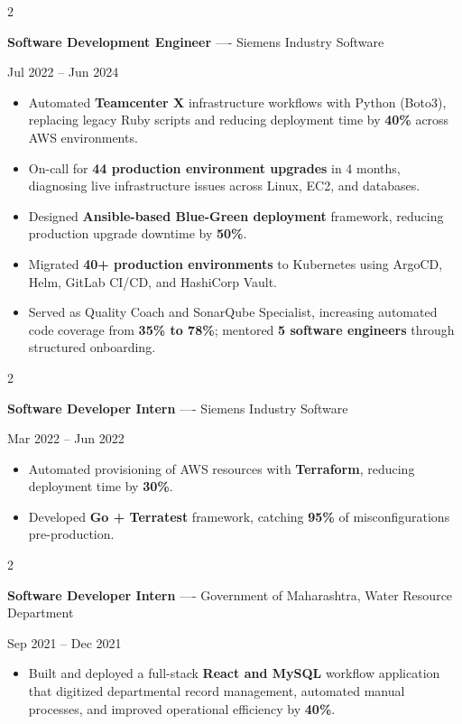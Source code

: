 \documentclass[10pt, letterpaper]{article}
\newenvironment{highlights}{
    \begin{itemize}[
        topsep=0.10 cm,
        parsep=0.06 cm,
        partopsep=0pt,
        itemsep=0.06 cm,
        leftmargin=12pt
    ]
}{
    \end{itemize}
}
\newenvironment{twocolentry}[2][]{
    \onecolentry
    \def\secondColumn{#2}
    \setcolumnwidth{\fill, 4.5 cm}
    \begin{paracol}{2}
}{
    \switchcolumn \raggedleft \secondColumn
    \end{paracol}
    \endonecolentry
}
\begin{document}
\vspace{0.15 cm}

\begin{twocolentry}{Jul 2022 -- Jun 2024}
\textbf{Software Development Engineer} ---- Siemens Industry Software
\end{twocolentry}
\begin{highlights}
  \item Automated \textbf{Teamcenter X} infrastructure workflows with Python (Boto3), replacing legacy Ruby scripts and reducing deployment time by \textbf{40\%} across AWS environments.
  \item On-call for \textbf{44 production environment upgrades} in 4 months, diagnosing live infrastructure issues across Linux, EC2, and databases.
  \item Designed \textbf{Ansible-based Blue-Green deployment} framework, reducing production upgrade downtime by \textbf{50\%}.
  \item Migrated \textbf{40+ production environments} to Kubernetes using ArgoCD, Helm, GitLab CI/CD, and HashiCorp Vault.
  \item Served as Quality Coach and SonarQube Specialist, increasing automated code coverage from \textbf{35\% to 78\%}; mentored \textbf{5 software engineers} through structured onboarding.
\end{highlights}

\vspace{0.15 cm}

\begin{twocolentry}{Mar 2022 -- Jun 2022}
\textbf{Software Developer Intern} ---- Siemens Industry Software
\end{twocolentry}
\begin{highlights}
  \item Automated provisioning of AWS resources with \textbf{Terraform}, reducing deployment time by \textbf{30\%}.
  \item Developed \textbf{Go + Terratest} framework, catching \textbf{95\%} of misconfigurations pre-production.
\end{highlights}

\vspace{0.15 cm}

\begin{twocolentry}{Sep 2021 -- Dec 2021}
\textbf{Software Developer Intern} ---- Government of Maharashtra, Water Resource Department
\end{twocolentry}
\begin{highlights}
  \item Built and deployed a full-stack \textbf{React and MySQL} workflow application that digitized departmental record management, automated manual processes, and improved operational efficiency by \textbf{40\%}.
\end{highlights}
\end{document}
